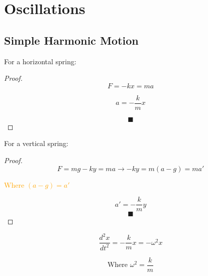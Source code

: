 \chapter*{Oscillations}

\section*{Simple Harmonic Motion}

\begin{minipage}{0.5\textwidth}
    For a horizontal spring:
    \begin{proof}
      \begin{equation*}
        F = -kx = ma
      \end{equation*}

      \begin{equation*}
        a = - \frac{k}{m}x
      \end{equation*}

      \[\blacksquare\]
    \end{proof}

  \vspace{0.5cm}
  \end{minipage}
  \begin{minipage}{0.5\textwidth}
    For a vertical spring:

    \begin{proof}
      \begin{equation*}
        F = mg - ky = ma \rightarrow -ky = m (a - g) = ma'
      \end{equation*}

        \textcolor{orange}{Where $(a - g) = a'$}

      \begin{equation*}
        a' = - \frac{k}{m}y
      \end{equation*}
      \[\blacksquare\]
    \end{proof}
  \end{minipage}

  \begin{equation*}
    \frac{d^2x}{dt^2} = - \frac{k}{m}x = - \omega^2x
  \end{equation*}

  \begin{equation*}
    {\text{Where } \omega^2 = \frac{k}{m}}
  \end{equation*}

  \newpage

